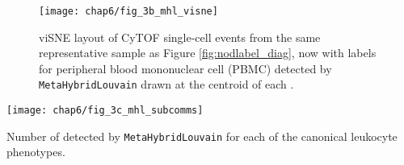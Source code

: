 \begin{figure}[htb]
  \centering
  \texttt{[image: chap6/fig\_3b\_mhl\_visne]}
  \caption[viSNE layout of \texttt{MetaHybridLouvain} \subcommunities{}]{viSNE layout of CyTOF single-cell events from the same representative sample as Figure \ref{fig:nodlabel_diag}, now with labels for peripheral blood mononuclear cell (PBMC) \subcommunities{} detected by \texttt{MetaHybridLouvain} drawn at the centroid of each \subcommunity{}.
  }
  \label{fig:mhl_visne}
\end{figure}
\begin{marginfigure}
  \centering
  \texttt{[image: chap6/fig\_3c\_mhl\_subcomms]}
  \caption[Number of \subcommunities{} detected by \texttt{MetaHybridLouvain} per canonical phenotype]{Number of \subcommunities{} detected by \texttt{MetaHybridLouvain} for each of the canonical leukocyte phenotypes.}
  \label{fig:mhl_subcomms}
\end{marginfigure}

